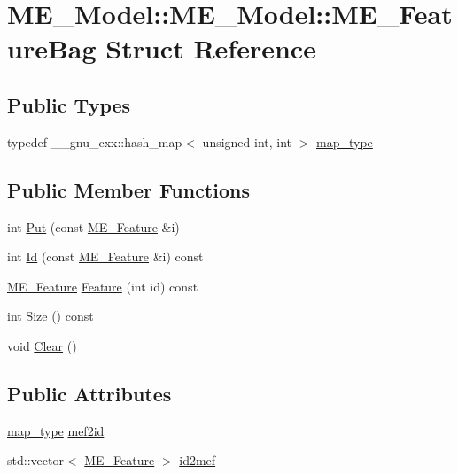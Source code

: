 \hypertarget{structME__Model_1_1ME__FeatureBag}{
\section{ME\_\-Model::ME\_\-Model::ME\_\-FeatureBag Struct Reference}
\label{structME__Model_1_1ME__FeatureBag}
}
\subsection*{Public Types}
\begin{CompactItemize}
\item 
typedef \_\-\_\-gnu\_\-cxx::hash\_\-map$<$ unsigned int, int $>$ \hyperlink{structME__Model_1_1ME__FeatureBag_d4e42dca8ac5b9a369e9c3882ae8741b}{map\_\-type}
\end{CompactItemize}
\subsection*{Public Member Functions}
\begin{CompactItemize}
\item 
int \hyperlink{structME__Model_1_1ME__FeatureBag_48df0cadbce52d82f012afd809d0eed4}{Put} (const \hyperlink{structME__Model_1_1ME__Feature}{ME\_\-Feature} \&i)
\item 
int \hyperlink{structME__Model_1_1ME__FeatureBag_91a032b84cb004c2aa9819bd5c727e29}{Id} (const \hyperlink{structME__Model_1_1ME__Feature}{ME\_\-Feature} \&i) const 
\item 
\hyperlink{structME__Model_1_1ME__Feature}{ME\_\-Feature} \hyperlink{structME__Model_1_1ME__FeatureBag_8f70045a4517cc8075832474eb4e01f1}{Feature} (int id) const 
\item 
int \hyperlink{structME__Model_1_1ME__FeatureBag_ef349bd03d50de36081b42ee5c717b86}{Size} () const 
\item 
void \hyperlink{structME__Model_1_1ME__FeatureBag_4ec198541dd60323cc15e72a246a0705}{Clear} ()
\end{CompactItemize}
\subsection*{Public Attributes}
\begin{CompactItemize}
\item 
\hyperlink{structME__Model_1_1ME__FeatureBag_d4e42dca8ac5b9a369e9c3882ae8741b}{map\_\-type} \hyperlink{structME__Model_1_1ME__FeatureBag_ae715d2d8e29e2bdec1413973bd677d7}{mef2id}
\item 
std::vector$<$ \hyperlink{structME__Model_1_1ME__Feature}{ME\_\-Feature} $>$ \hyperlink{structME__Model_1_1ME__FeatureBag_b2af8688c42c45aef0e15fdd5aa940a2}{id2mef}
\end{CompactItemize}


